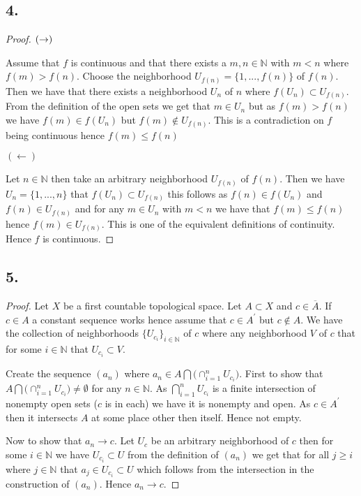 \documentclass{amsart}
\theoremstyle{plain}
\theoremstyle{definition}
\theoremstyle{remark}
\begin{document}
\subsection*{4.} 
\begin{proof}


    $\\ (\rightarrow)$


    Assume that $f$ is continuous and that there exists a $m,n\in \mathbb{N}$ with $m<n$ where $f(m)> f(n)$. Choose the neighborhood $U_{f(n)}=\{1,...,f(n)\}$ of $f(n)$. Then we have that there exists a neighborhood $U_n$ of $n$ where $f(U_n)\subset U_{f(n)}$. From the definition of the open sets we get that $m\in U_n$ but as $f(m)> f(n)$ we have $f(m)\in f(U_n)$ but $f(m)\not \in U_{f(n)}$. This is a contradiction on $f$ being continuous hence $f(m)\leq f(n)$

    $(\leftarrow)$


    Let $n\in \mathbb{N}$ then take an arbitrary neighborhood $U_{f(n)}$ of $f(n)$. Then we have $U_{n}=\{1,...,n\}$ that $f(U_n)\subset U_{f(n)}$ this follows as $f(n)\in f(U_n)$ and $f(n)\in U_{f(n)}$ and for any $m\in U_n$ with $m<n$ we have that $f(m)\leq f(n)$ hence $f(m)\in U_{f(n)}$. This is one of the equivalent definitions of continuity. Hence $f$ is continuous.
\end{proof}


\subsection*{5.}


\begin{proof}
    
    Let $X$ be a first countable topological space. Let $A\subset X$ and $c\in \overline A$. If $c\in A$ a constant sequence works hence assume that $c\in A^\prime$ but $c\not \in A$. We have the collection of neighborhoods $\{U_{c_i}\}_{i\in \mathbb{N}}$ of $c$ where any neighborhood $V$ of $c$ that for some $i\in \mathbb{N}$ that $U_{c_i}\subset V$.

    Create the sequence $(a_n)$ where $a_n \in A\bigcap \big( \cap _{i=1}^n U_{c_i}\big)$. First to show that $A\bigcap \big(\cap_{i=1}^n U_{c_i} \big)\not = \emptyset$ for any $n\in \mathbb{N}$. As $\bigcap_{i=1}^nU_{c_i}$ is a finite intersection of nonempty open sets  ($c$ is in each) we have it is nonempty and open. As $c\in A^\prime$  then it intersects $A$ at some place other then itself. Hence not empty. 

    Now to show that $a_n\to c$. Let $U_c$ be an arbitrary neighborhood of $c$ then for some $i\in \mathbb{N}$ we have $U_{c_i}\subset U$ from the definition of $(a_n)$ we get that for all $j\geq i$ where $j\in \mathbb{N}$ that $a_j\in U_{c_i}\subset U$ which follows from the intersection in the construction of $(a_n)$. Hence $a_n\to c$.
\end{proof}
\end{document}
